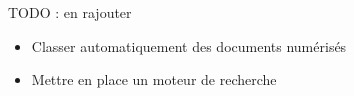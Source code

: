
TODO : en rajouter

\begin {itemize}
\item Classer automatiquement des documents numérisés
\item Mettre en place un moteur de recherche
\end {itemize}


